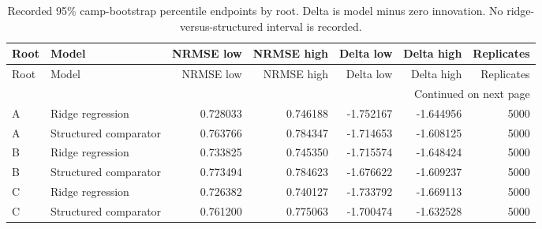 \footnotesize
\setlength{\tabcolsep}{2.1pt}
\renewcommand{\arraystretch}{1.12}
\begin{longtable}{p{0.42in}p{1.15in}rrrrr}
\caption{Recorded 95\% camp-bootstrap percentile endpoints by root. Delta is model minus zero innovation. No ridge-versus-structured interval is recorded.}\label{supp:uncertainty}\\
\toprule
Root & Model & NRMSE low & NRMSE high & Delta low & Delta high & Replicates \\
\midrule
\endfirsthead
\toprule
Root & Model & NRMSE low & NRMSE high & Delta low & Delta high & Replicates \\
\midrule
\endhead
\midrule
\multicolumn{7}{r}{Continued on next page}\\
\endfoot
\bottomrule
\endlastfoot
A & Ridge regression & 0.728033 & 0.746188 & -1.752167 & -1.644956 & 5000 \\
A & Structured comparator & 0.763766 & 0.784347 & -1.714653 & -1.608125 & 5000 \\
B & Ridge regression & 0.733825 & 0.745350 & -1.715574 & -1.648424 & 5000 \\
B & Structured comparator & 0.773494 & 0.784623 & -1.676622 & -1.609237 & 5000 \\
C & Ridge regression & 0.726382 & 0.740127 & -1.733792 & -1.669113 & 5000 \\
C & Structured comparator & 0.761200 & 0.775063 & -1.700474 & -1.632528 & 5000 \\
\end{longtable}
